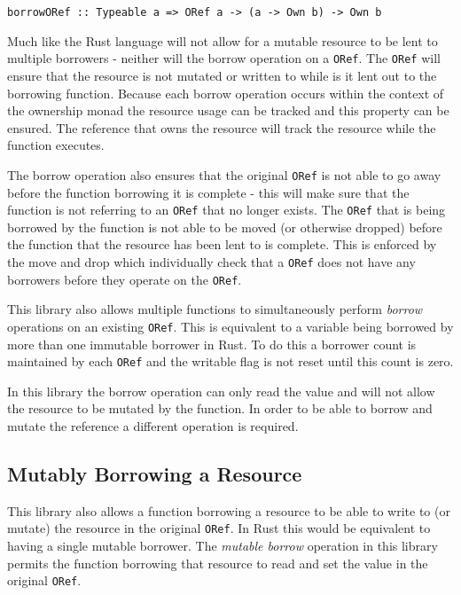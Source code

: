 \documentclass[onehalf,11pt]{beavtex}
\begin{document}
\begin{verbatim}
borrowORef :: Typeable a => ORef a -> (a -> Own b) -> Own b
\end{verbatim}

Much like the Rust language will not allow for a mutable resource to be lent to
multiple borrowers - neither will the borrow operation on a \texttt{ORef}.
The \texttt{ORef} will ensure that the resource is not mutated or written to while is it
lent out to the borrowing function. 
Because each borrow operation occurs within the context of the ownership monad
the resource usage can be tracked and this property can be ensured. The
reference that owns the resource will track the resource while the function
executes.

The borrow operation also ensures that the original \texttt{ORef} is not able to go away
before the function borrowing it is complete - this will make sure that the
function is not referring to an \texttt{ORef} that no longer exists.  The \texttt{ORef} that is
being borrowed by the function is not able to be moved (or otherwise dropped)
before the function that the resource has been lent to is complete. This is
enforced by the move and drop which individually check that
a \texttt{ORef} does not have any borrowers before they operate on the \texttt{ORef}.

This library also allows multiple functions to simultaneously perform
\textit{borrow} operations on an existing \texttt{ORef}. This is equivalent to a variable
being borrowed by more than one immutable borrower in Rust. To do this a
borrower count is maintained by each \texttt{ORef} and the writable flag is not
reset until this count is zero.

In this library the borrow operation can only read the value and will not allow
the resource to be mutated by the function.  In order to be able to borrow and
mutate the reference a different operation is required.

\subsection{Mutably Borrowing a Resource}

This library also allows a function borrowing a resource to be able to
write to (or mutate) the resource in the original \texttt{ORef}.  In Rust this would be
equivalent to having a single mutable borrower.  The \textit{mutable borrow}
operation in this library permits the function borrowing that resource to read
and set the value in the original \texttt{ORef}.
\end{document}
